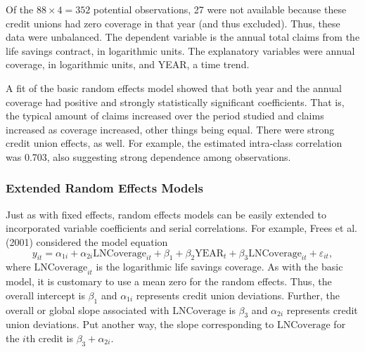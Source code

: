 Of the $88 \times 4=352$ potential observations, 27 were not
available because these credit unions had zero coverage in that year
(and thus excluded). Thus, these data were unbalanced. The dependent
variable is the annual total claims from the life savings contract,
in logarithmic units. The explanatory variables were annual
coverage, in logarithmic units, and YEAR, a time trend.

A fit of the basic random effects model showed that both year and
the annual coverage had positive and  strongly statistically
significant coefficients. That is, the typical amount of claims
increased over the period studied and claims increased as coverage
increased, other things being equal. There were strong credit union
effects, as well. For example, the estimated intra-class correlation
was 0.703, also suggesting strong dependence among observations.

\linejed

\subsubsection*{Extended Random Effects Models}

Just as with fixed effects, random effects models can be easily
extended to incorporated variable coefficients and serial
correlations. For example, Frees et al. (2001) considered the model
equation
\begin{equation}\label{E10:REExample}
y_{it} = \alpha_{1i} + \alpha_{2i} \mathrm{LNCoverage}_{it}+ \beta_1
+ \beta_2 \mathrm{YEAR}_t+ \beta_3 \mathrm{LNCoverage}_{it}+
\varepsilon_{it} ,
\end{equation}
where $\mathrm{LNCoverage}_{it}$ is the logarithmic life savings
coverage. As with the basic model, it is customary to use a mean
zero for the random effects. Thus, the overall intercept is
$\beta_1$ and $\alpha_{1i}$ represents credit union deviations.
Further, the overall or global slope associated with
$\mathrm{LNCoverage}$ is $\beta_3$ and $\alpha_{2i}$ represents
credit union deviations. Put another way, the slope corresponding to
$\mathrm{LNCoverage}$ for the $i$th credit is $\beta_3 +
\alpha_{2i}$.

